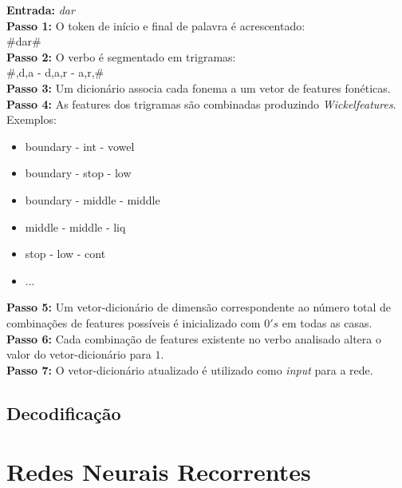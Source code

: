\textbf{Entrada:} \textit{dar}\\

\textbf{Passo 1:} O token de início e final de palavra é acrescentado:\\
\hspace*{6.0em}      \#dar\#\\

\textbf{Passo 2:} O verbo é segmentado em trigramas:\\
\hspace*{6.0em}\#,d,a - d,a,r - a,r,\#\\

\textbf{Passo 3:} Um dicionário associa cada fonema a um vetor de features fonéticas.\\

\textbf{Passo 4:} As features dos trigramas são combinadas produzindo \textit{Wickelfeatures}.\\

Exemplos:
\begin{itemize}
\item boundary - int - vowel 
\item boundary - stop - low
\item boundary - middle - middle
\item middle - middle - liq
\item stop - low - cont
\item ...
\end{itemize}


\textbf{Passo 5:} Um vetor-dicionário de dimensão correspondente ao número total de combinações de features possíveis é inicializado com $0's$ em todas as casas.\\

\textbf{Passo 6:} Cada combinação de features existente no verbo analisado altera o valor do vetor-dicionário para $1$.\\

\textbf{Passo 7:} O vetor-dicionário atualizado é utilizado como \textit{input} para a rede.

\subsection{Decodificação}
\label{sec:dec}


\section{Redes Neurais Recorrentes}
\label{sec:RNN}

